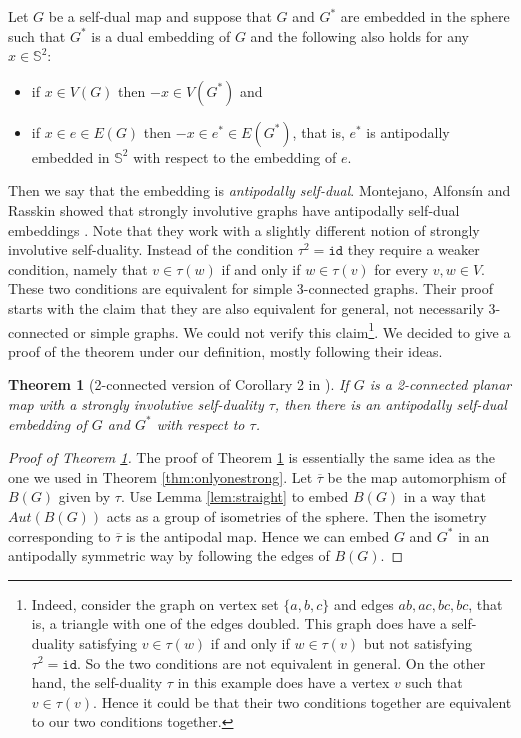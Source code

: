 \documentclass{article}
\newtheorem{theorem}{Theorem}[section]
\newcommand{\id}{\mathtt{id}}
\begin{document}
Let $G$ be a self-dual map and suppose that $G$ and $G^*$ are embedded in the sphere such that  $G^*$ is a dual embedding of $G$ and the following also holds for any $x \in \mathbb{S}^2$:

\begin{itemize}
    \item if $x \in V(G)$ then $-x \in V (G^*)$ and 
    \item if $x \in e \in E(G)$ then $-x \in e^{*} \in E(G^*)$, that is, $e^*$ is antipodally embedded in $\mathbb{S}^2$ with respect to the embedding of $e$.
\end{itemize}



Then we say that the embedding is \emph{antipodally self-dual}. Montejano, Alfonsín and Rasskin showed that strongly involutive graphs have antipodally self-dual embeddings \cite{montejano2022self}. Note that they work with a slightly different notion of strongly involutive self-duality. Instead of the condition $\tau^2=\id$ they require a weaker condition, namely that $v\in  \tau(w)$ if and only if $w\in\tau(v)$ for every $v,w\in V$. These two conditions are equivalent for simple 3-connected  graphs. Their proof starts with the claim that they are also equivalent for general, not necessarily 3-connected or simple graphs. We could not verify this claim\footnote{Indeed, consider the graph on vertex set $\{a,b,c\}$ and edges $ab,ac,bc,bc$, that is, a triangle with one of the edges doubled. This graph does have a self-duality satisfying $v\in \tau(w)$ if and only if $w\in\tau(v)$ but not satisfying $\tau^2=\id$. So the two conditions are not equivalent in general. On the other hand, the self-duality $\tau$ in this example does have a vertex $v$ such that $v\in\tau(v)$. Hence it could be that their two conditions together are equivalent to our two conditions together.}. We decided to give a proof of the theorem under our definition, mostly following their ideas.  


\begin{theorem}[2-connected version of Corollary 2 in \cite{montejano2022self}]\label{thm:strisantipodal}
If $G$ is a 2-connected planar map with a strongly involutive self-duality $\tau$, then there is an antipodally self-dual embedding of $G$ and $G^*$ with respect to $\tau$. 
\end{theorem}


\begin{proof}[Proof of Theorem \ref{thm:strisantipodal}]    
The proof of Theorem \ref{thm:strisantipodal} is essentially the same idea as the one we used in Theorem \ref{thm:onlyonestrong}. Let $\overline{\tau}$ be the map automorphism of $B(G)$ given by $\tau$. Use Lemma \ref{lem:straight} to embed $B(G)$ in a way that $Aut(B(G))$ acts as a group of isometries of the sphere. Then the isometry corresponding to $\overline{\tau}$ is the antipodal map. Hence we can embed $G$ and $G^*$ in an antipodally symmetric way by following the edges of $B(G)$.   
\end{proof}
\end{document}
